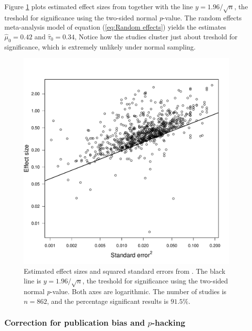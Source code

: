 Figure \ref{fig:motyl} plots estimated effect sizes from \cite{Motyl2017-dx}
together with the line $y=1.96/\sqrt{n}$, the treshold for significance
using the two-sided normal \emph{p}-value. The random effects meta-analysis
model of equation (\ref{eq:Random effects}) yields the estimates
$\hat{\mu}_{0}=0.42$ and $\hat{\tau}_{0}=0.34$, Notice how the studies
cluster just about treshold for significance, which is extremely unlikely
under normal sampling.

\begin{figure}
\noindent \begin{centering}
\includegraphics[scale=0.5]{chunks/motyl}
\par\end{centering}
\caption{\label{fig:motyl}Estimated effect sizes and squared standard errors
from \cite{Motyl2017-dx}. The black line is $y=1.96/\sqrt{n}$,
the treshold for significance using the two-sided normal \emph{p}-value.
Both axes are logarithmic. The number of studies is $n=862$, and
the percentage significant results is $91.5\%$.}
\end{figure}


\subsubsection{Correction for publication bias and $p$-hacking}


